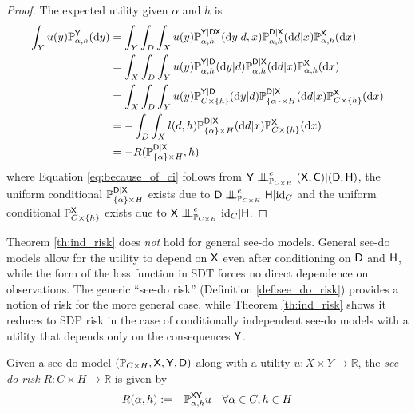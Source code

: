 \begin{proof}
The expected utility given $\alpha$ and $h$ is
\begin{align}
    \int_Y u(y)\mathbb{P}_{\alpha,h}^{\mathsf{Y}}(\mathrm{d}y) &= \int_Y  \int_D \int_{X} u(y)\mathbb{P}_{\alpha,h}^{\mathsf{Y}|\mathsf{DX}}(\mathrm{d}y|d,x)\mathbb{P}_{\alpha,h}^{\mathsf{D}|\mathsf{X}}(\mathrm{d}d|x)\mathbb{P}_{\alpha,h}^{\mathsf{X}}(\mathrm{d}x) \\
    &= \int_X  \int_D \int_{Y} u(y) \mathbb{P}_{\alpha,h}^{\mathsf{Y}|\mathsf{D}}(\mathrm{d}y|d)\mathbb{P}_{\alpha,h}^{\mathsf{D}|\mathsf{X}}(\mathrm{d}d|x)\mathbb{P}_{\alpha,h}^{\mathsf{X}}(\mathrm{d}x)\label{eq:because_of_ci}\\
    &= \int_{X} \int_D \int_Y u(y) \mathbb{P}_{C\times\{h\}}^{\mathsf{Y}|\mathsf{D}}(\mathrm{d}y|d)\mathbb{P}_{\{\alpha\}\times H}^{\mathsf{D}|\mathsf{X}}(\mathrm{d}d|x)\mathbb{P}_{C\times\{h\}}^{\mathsf{X}}(\mathrm{d}x)\\
     &= -\int_D\int_X l(d,h)\mathbb{P}_{\{\alpha\}\times H}^{\mathsf{D}|\mathsf{X}}(\mathrm{d}d|x)\mathbb{P}_{C\times\{h\}}^{\mathsf{X}}(\mathrm{d}x)\\
    &= -R(\mathbb{P}_{\{\alpha\}\times H}^{\mathsf{D}|\mathsf{X}},h)
\end{align}
where Equation \eqref{eq:because_of_ci} follows from $\RV{Y}\CI^e_{\prob{P}_{C\times H}} (\RV{X,C})|(\RV{D},\RV{H})$, the uniform conditional $\mathbb{P}_{\{\alpha\}\times H}^{\mathsf{D}|\mathsf{X}}$ exists due to $\RV{D}\CI^e_{\prob{P}_{C\times H}} \RV{H}|\text{id}_C$ and the uniform conditional $\mathbb{P}_{C\times\{h\}}^{\mathsf{X}}$ exists due to $\RV{X}\CI^e_{\prob{P}_{C\times H}} \text{id}_C|\RV{H}$.
\end{proof}

Theorem \ref{th:ind_risk} does \emph{not} hold for general see-do models. General see-do models allow for the utility to depend on $\mathsf{X}$ even after conditioning on $\mathsf{D}$ and $\mathsf{H}$, while the form of the loss function in SDT forces no direct dependence on observations. The generic ``see-do risk'' (Definition \ref{def:see_do_risk}) provides a notion of risk for the more general case, while Theorem \ref{th:ind_risk} shows it reduces to SDP risk in the case of conditionally independent see-do models with a utility that depends only on the consequences $\mathsf{Y}$.
\begin{definition}\label{def:see_do_risk}
Given a see-do model $(\mathbb{P}_{C\times H}, \mathsf{X},\mathsf{Y},\mathsf{D})$ along with a utility $u:X\times Y\to \mathbb{R}$, the \emph{see-do risk} $R:C\times H\to \mathbb{R}$ is given by
\begin{align}
    R(\alpha,h) &:= -\mathbb{P}_{\alpha,h}^{\mathsf{XY}}u&\forall \alpha\in C,h\in H
\end{align}
\end{definition}

